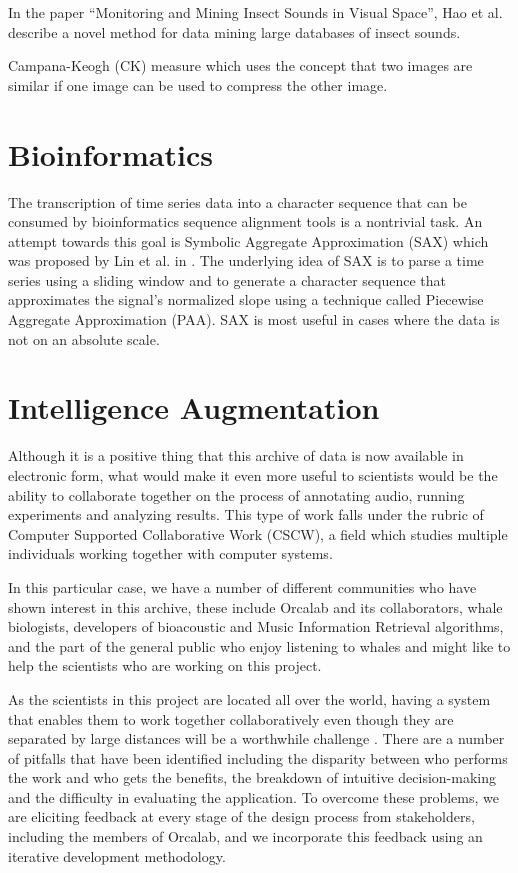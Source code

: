 \documentclass[12pt,oneside]{book}
\begin{document}
In the paper ``Monitoring and Mining Insect Sounds in Visual
Space''\cite{hao12}, Hao et al. describe a novel method for data
mining large databases of insect sounds. 

Campana-Keogh (CK) measure \cite{campana2010} which uses the
concept that two images are similar if one image can be used to
compress the other image. 

\section{Bioinformatics}

The transcription of time series data into a character sequence that
can be consumed by bioinformatics sequence alignment tools is a
nontrivial task.  An attempt towards this goal is Symbolic Aggregate
Approximation (SAX) which was proposed by Lin et al. in
\cite{Lin2003}. The underlying idea of SAX is to parse a time series
using a sliding window and to generate a character sequence that
approximates the signal's normalized slope using a technique called
Piecewise Aggregate Approximation (PAA).  SAX is most useful in cases
where the data is not on an absolute scale.  


\section{Intelligence Augmentation}
\label{section:relatedWork:intelligenceAugmentation}

Although it is a positive thing that this archive of data is now
available in electronic form, what would make it even more useful to
scientists would be the ability to collaborate together on the process
of annotating audio, running experiments and analyzing results.  This
type of work falls under the rubric of Computer Supported
Collaborative Work \cite{bannon91} (CSCW), a field which studies
multiple individuals working together with computer systems.

In this particular case, we have a number of different communities who
have shown interest in this archive, these include Orcalab and its
collaborators, whale biologists, developers of bioacoustic and Music
Information Retrieval algorithms, and the part of the general public
who enjoy listening to whales and might like to help the scientists
who are working on this project.  

As the scientists in this project are located all over the world,
having a system that enables them to work together collaboratively
even though they are separated by large distances will be a worthwhile
challenge \cite{bradner02} \cite{olson00}.  There are a number of
pitfalls that have been identified \cite{grudin88} including the
disparity between who performs the work and who gets the benefits, the
breakdown of intuitive decision-making and the difficulty in
evaluating the application.  To overcome these problems, we are
eliciting feedback at every stage of the design process from
stakeholders, including the members of Orcalab, and we incorporate
this feedback using an iterative development methodology.
\end{document}
